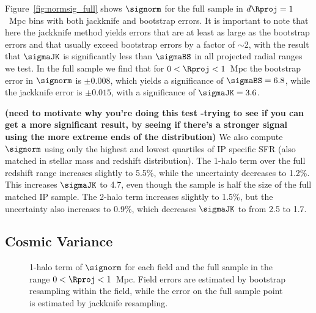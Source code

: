 Figure~\ref{fig:normsig_full} shows $\signorm$ for the full sample in {$d\Rproj=1$~Mpc} bins with both jackknife and bootstrap errors.
It is important to note that here the jackknife method yields errors that are at least as large as the bootstrap errors and that usually exceed bootstrap errors by a factor of $\sim$2, with the result that $\sigmaJK$ is significantly less than $\sigmaBS$ in all projected radial ranges we test.
In the full sample we find that for {$0<\Rproj<1$~Mpc} the bootstrap error in $\signorm$ is ${\pm0.008}$, which yields a significance of $\sigmaBS=6.8$, while the jackknife error is ${\pm0.015}$, with a significance of $\sigmaJK=3.6$.


{\bf(need to motivate why you're doing this test -trying to see if you can get a more significant result, by seeing if there's a stronger signal using the more extreme ends of the distribution)}
We also compute $\signorm$ using only the highest and lowest quartiles of IP specific SFR (also matched in stellar mass and redshift distribution).
The 1-halo term over the full redshift range increases slightly to 5.5\%, while the uncertainty decreases to 1.2\%.
This increases $\sigmaJK$ to 4.7, even though the sample is half the size of the full matched IP sample.
The 2-halo term increases slightly to 1.5\%, but the uncertainty also increases to 0.9\%, which decreases $\sigmaJK$ to from 2.5 to 1.7.






\subsection{Cosmic Variance}\label{sec:cosmic_var}

\begin{figure}
  \epstrim{0.4in 0.7in 0.3in 0.3in}
  \caption{
1-halo term of $\signorm$ for each field and the full sample in the range {$0<\Rproj<1$~Mpc}.
Field errors are estimated by bootstrap resampling within the field, while the error on the full sample point is estimated by jackknife resampling.
}
  \label{fig:normsig_fields_1halo}
\end{figure}





